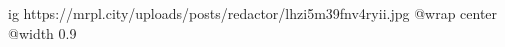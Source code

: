  
 
 
 
 

\ifcmt
  ig https://mrpl.city/uploads/posts/redactor/lhzi5m39fnv4ryii.jpg
  @wrap center
  @width 0.9
\fi
